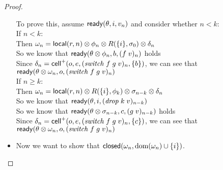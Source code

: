 \begin{proof}
\begin{itemize}
  \begin{tabbedproof}
    \oo To prove this, assume $\mathsf{ready}({\theta}, {i}, {v_n})$ and consider whether $n < k$:\\
    \oo If $n < k$:\\
    \ooo Then $\omega_n = \mathsf{local}({r}, {n}) \otimes \phi_n \otimes R(\{{i}\}, \sigma_0) \otimes \delta_n$ \\
    \ooo So we know that $\mathsf{ready}({\theta \otimes \phi_n}, {b}, {(f\;v)_n})$ holds \\
    \ooo Since $\delta_n = \mathsf{cell}^{+}({o}, {e}, {(\mathit{switch}\;f\;g\;v)_n}, {\{{b}\}})$, we can see that \\
    \ooo $\mathsf{ready}({\theta \otimes \omega_n}, {o}, {(\mathit{switch}\;f\;g\;v)_n})$ \\
    \oo If $n \geq k$: \\
    \ooo Then $\omega_n = \mathsf{local}({r}, {n}) \otimes R(\{{i}\}, \phi_k) \otimes \sigma_{n-k} \otimes \delta_n$ \\
    \ooo So we know that $\mathsf{ready}({\theta}, {i}, {(\mathit{drop}\;k\;v)_{n-k}})$ \\
    \ooo So we know that $\mathsf{ready}({\theta \otimes \sigma_{n-k}}, {c}, {(g\;v)_{n-k}})$ holds \\
    \ooo Since $\delta_n = \mathsf{cell}^{+}({o}, {e}, {(\mathit{switch}\;f\;g\;v)_n}, {\{{c}\}})$, we can see that \\
    \ooo $\mathsf{ready}({\theta \otimes \omega_n}, {o}, {(\mathit{switch}\;f\;g\;v)_n})$ \\
  \end{tabbedproof}

\item Now we want to show that $\mathsf{closed}({\omega_n}, {\mbox{dom}({\omega_n}) \cup \{{i}\}})$. 


\end{itemize}
\end{proof}
